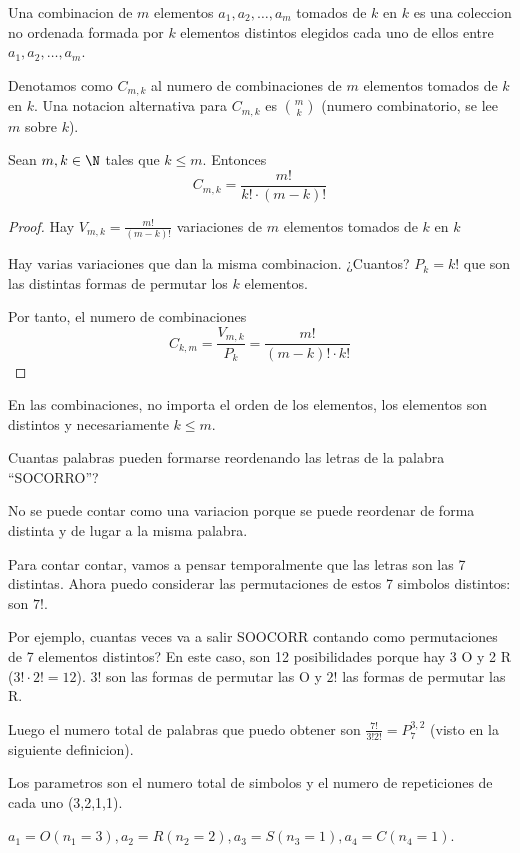 \begin{definition}
	Una combinacion de \(m \) elementos \(a_1,a_2,\ldots,a_m \) tomados de \(k \) en \(k \) es una coleccion no ordenada formada por \(k \) elementos distintos elegidos cada uno de ellos entre \(a_1, a_2, \ldots, a_m \).

	Denotamos como \(C_{m,k}\) al numero de combinaciones de \(m \) elementos tomados de \(k \) en \(k \). Una notacion alternativa para \(C_{m,k}\) es \(\binom{m }{k }\) (numero combinatorio, se lee \(m \) sobre \(k\)).
\end{definition}
\begin{theorem}
	Sean \(m,k \in \N \) tales que \(k \leq m \). Entonces
	\[
		C_{m,k} = \frac{m!}{k! \cdot (m-k)!}
	\]
\end{theorem}
\begin{proof}
	Hay \(V_{m,k} = \frac{m!}{(m-k)!}\) variaciones de \(m \) elementos tomados de \(k \) en \(k \)

	Hay varias variaciones que dan la misma combinacion. ¿Cuantos? \(P_k = k! \) que son las distintas formas de permutar los \(k \) elementos.

	Por tanto, el numero de combinaciones
	\[
		C_{k,m} = \frac{V_{m,k}}{P_k} = \frac{m! }{(m-k)! \cdot k!}
	\]
\end{proof}

En las combinaciones, no importa el orden de los elementos, los elementos son distintos y necesariamente \(k \leq m \).

\begin{example}
	Cuantas palabras pueden formarse reordenando las letras de la palabra ``SOCORRO''?

	No se puede contar como una variacion porque se puede reordenar de forma distinta y de lugar a la misma palabra.

	Para contar contar, vamos a pensar temporalmente que las letras son las 7 distintas. Ahora puedo considerar las permutaciones de estos 7 simbolos distintos: son \(7! \).

	Por ejemplo, cuantas veces va a salir SOOCORR contando como permutaciones de 7 elementos distintos? En este caso, son 12 posibilidades porque hay 3 O y 2 R (\(3! \cdot 2! = 12\)). \(3! \) son las formas de permutar las O y \(2! \) las formas de permutar las R.

	Luego el numero total de palabras que puedo obtener son \(\frac{7! }{3!2!} = P^{3,2}_7 \) (visto en la siguiente definicion).

	Los parametros son el numero total de simbolos y el numero de repeticiones de cada uno (3,2,1,1).

	\(a_1 = O (n_1 = 3), a_2 = R (n_2 = 2), a_3 = S (n_3 = 1), a_4 = C (n_4 = 1)\).
\end{example}

